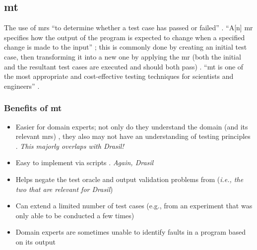 \subsection{\acf{mt}}
\label{chap:notes:sec:metamorphic-testing}
The use of \acfp{mr} ``to determine whether a test case has passed or failed''
\cite[p.~67]{kanewala_metamorphic_2019}. ``A[n] \acs{mr} specifies how the
output of the program is expected to change when a specified change is made to
the input'' \cite[p.~67]{kanewala_metamorphic_2019}; this is commonly done by
creating an initial test case, then transforming it into a new one by applying
the \acs{mr} (both the initial and the resultant test cases are executed and
should both pass) \cite[p.~68]{kanewala_metamorphic_2019}. ``\acs{mt} is one of
the most appropriate and cost-effective testing techniques for scientists and
engineers'' \cite[p.~72]{kanewala_metamorphic_2019}.

\subsubsection{Benefits of \acs{mt}}
\begin{itemize}
      \item Easier for domain experts; not only do they understand the domain
            (and its relevant \acp{mr}) \cite[p.~70]{kanewala_metamorphic_2019},
            they also may not have an understanding of testing principles
            \cite[p.~69]{kanewala_metamorphic_2019}. \emph{This majorly
                  overlaps with Drasil!}
      \item Easy to implement via scripts \cite[p.~69]{kanewala_metamorphic_2019}.
            \emph{Again, Drasil}
      \item Helps negate the test oracle \cite[p.~69]{kanewala_metamorphic_2019}
            and output validation \cite[p.~70]{kanewala_metamorphic_2019} problems
            from  (\emph{i.e.,
                  the two that are relevant for Drasil})
      \item Can extend a limited number of test cases (e.g., from an
            experiment that was only able to be conducted a few times)
            \cite[pp.~70-72]{kanewala_metamorphic_2019}
      \item Domain experts are sometimes unable to identify faults in a program
            based on its output \cite[p.~71]{kanewala_metamorphic_2019}
\end{itemize}

